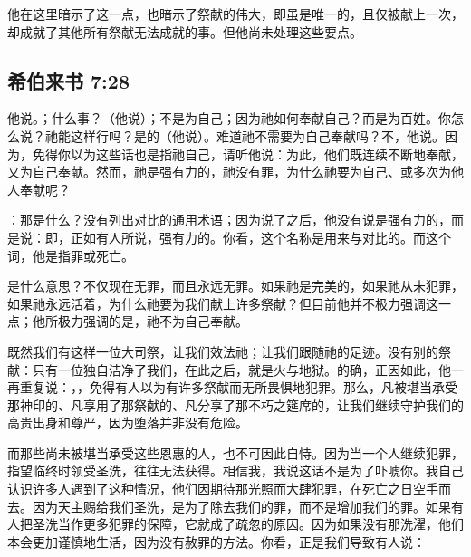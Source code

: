 他在这里暗示了这一点，也暗示了祭献的伟大，即虽是唯一的，且仅被献上一次，却成就了其他所有祭献无法成就的事。但他尚未处理这些要点。\par


\subsection{希伯来书 7:28}

他说。；什么事？（他说）；不是为自己；因为祂如何奉献自己？而是为百姓。你怎么说？祂能这样行吗？是的（他说）。难道祂不需要为自己奉献吗？不，他说。因为，免得你以为这些话也是指祂自己，请听他说：为此，他们既连续不断地奉献，又为自己奉献。然而，祂是强有力的，祂没有罪，为什么祂要为自己、或多次为他人奉献呢？\par

：那是什么？没有列出对比的通用术语；因为说了之后，他没有说是强有力的，而是说：即，正如有人所说，强有力的。你看，这个名称是用来与对比的。而这个词，他是指罪或死亡。\par

是什么意思？不仅现在无罪，而且永远无罪。如果祂是完美的，如果祂从未犯罪，如果祂永远活着，为什么祂要为我们献上许多祭献？但目前他并不极力强调这一点；他所极力强调的是，祂不为自己奉献。\par

既然我们有这样一位大司祭，让我们效法祂；让我们跟随祂的足迹。没有别的祭献：只有一位独自洁净了我们，在此之后，就是火与地狱。的确，正因如此，他一再重复说：，，免得有人以为有许多祭献而无所畏惧地犯罪。那么，凡被堪当承受那神印的、凡享用了那祭献的、凡分享了那不朽之筵席的，让我们继续守护我们的高贵出身和尊严，因为堕落并非没有危险。\par

而那些尚未被堪当承受这些恩惠的人，也不可因此自恃。因为当一个人继续犯罪，指望临终时领受圣洗，往往无法获得。相信我，我说这话不是为了吓唬你。我自己认识许多人遇到了这种情况，他们因期待那光照而大肆犯罪，在死亡之日空手而去。因为天主赐给我们圣洗，是为了除去我们的罪，而不是增加我们的罪。如果有人把圣洗当作更多犯罪的保障，它就成了疏忽的原因。因为如果没有那洗濯，他们本会更加谨慎地生活，因为没有赦罪的方法。你看，正是我们导致有人说：\par

